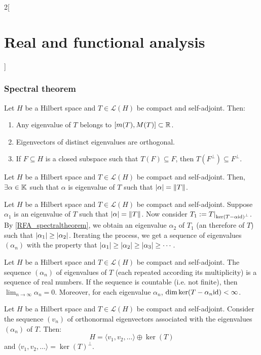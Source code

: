 \documentclass[../../../main_math.tex]{subfiles}
\begin{document}
\begin{multicols}{2}[\section{Real and functional analysis}]
  \subsubsection{Spectral theorem}
  \begin{proposition}
    Let $H$ be a Hilbert space and $T\in\mathcal{L}(H)$ be compact and self-adjoint. Then:
    \begin{enumerate}
      \item Any eigenvalue of $T$ belongs to $[m(T),M(T)]\subset\mathbb{R}$.
      \item Eigenvectors of distinct eigenvalues are orthogonal.
      \item If $F\subseteq H$ is a closed subspace such that $T(F)\subseteq F$, then $T(F^\perp)\subseteq F^\perp$.
    \end{enumerate}
  \end{proposition}
  \begin{theorem}\label{RFA_spectraltheorem}
    Let $H$ be a Hilbert space and $T\in\mathcal{L}(H)$ be compact and self-adjoint. Then, $\exists \alpha\in \mathbb{K}$ such that $\alpha$ is eigenvalue of $T$ such that $\abs{\alpha}=\left\|T\right\|$.
  \end{theorem}
  \begin{corollary}
    Let $H$ be a Hilbert space and $T\in\mathcal{L}(H)$ be compact and self-adjoint. Suppose $\alpha_1$ is an eigenvalue of $T$ such that $\abs{\alpha}=\left\|T\right\|$. Now consider $T_1:=T|_{{\ker(T-\alpha\mathrm{id})}^\perp}$. By \cref{RFA_spectraltheorem}, we obtain an eigenvalue $\alpha_2$ of $T_1$ (an therefore of $T$) such that $\abs{\alpha_1}\geq \abs{\alpha_2}$. Iterating the process, we get a sequence of eigenvalues $(\alpha_n)$ with the property that $\abs{\alpha_1}\geq \abs{\alpha_2}\geq\abs{\alpha_3}\geq\cdots$.
  \end{corollary}
  \begin{theorem}
    Let $H$ be a Hilbert space and $T\in\mathcal{L}(H)$ be compact and self-adjoint. The sequence $(\alpha_n)$ of eigenvalues of $T$ (each repeated according its multiplicity) is a sequence of real numbers. If the sequence is countable (i.e. not finite), then $\lim_{n\to\infty}\alpha_n=0$. Moreover, for each eigenvalue $\alpha_n$, $\dim\ker(T-\alpha_n\mathrm{id})<\infty$.
  \end{theorem}
  \begin{lemma}
    Let $H$ be a Hilbert space and $T\in\mathcal{L}(H)$ be compact and self-adjoint. Consider the sequence $(v_n)$ of orthonormal eigenvectors associated with the eigenvalues $(\alpha_n)$ of $T$. Then: $$H=\langle v_1,v_2,\ldots\rangle\oplus \ker(T)$$ and $\langle v_1,v_2,\ldots\rangle={\ker(T)}^\perp$.

\end{lemma}
\end{multicols}
\end{document}
